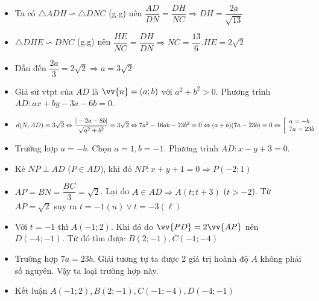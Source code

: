 \begin{itemize}[leftmargin=*,label=]
\item Ta có $\triangle ADH\backsim \triangle DNC$ (g.g) nên $\dfrac{AD}{DN}=\dfrac{DH}{NC}\Rightarrow DH=\dfrac{2a}{\sqrt{13}}$
\item $\triangle DHE\backsim DNC$ (g.g) nên $\dfrac{HE}{NC}=\dfrac{DH}{DN}\Rightarrow NC=\dfrac{13}{6}.HE=2\sqrt{2}$
\item Dẫn đến $\dfrac{2a}{3}=2\sqrt{2}\Rightarrow a=3\sqrt{2}$
\item Giả sử vtpt của $AD$ là $\vv{n}=(a;b)$ với $a^2+b^2>0$. Phương trình $AD:ax+by-3a-6b=0$.
\item $d(N,AD)=3\sqrt{2}\Leftrightarrow \dfrac{|-2a-8b|}{\sqrt{a^2+b^2}}=3\sqrt{2}\Leftrightarrow 7a^2-16ab-23b^2=0 \Leftrightarrow (a+b)(7a-23b)=0 \Leftrightarrow \left[\begin{array}{ll}a=-b \\ 7a=23b\end{array}\right.$
\item Trường hợp $a=-b$. Chọn $a=1, b=-1$. Phương trình $AD:x-y+3=0$.  
\item Kẻ $NP\perp AD$ ($P\in AD$), khi đó $NP:x+y+1=0 \Rightarrow P(-2;1)$
\item $AP=BN=\dfrac{BC}{3}=\sqrt{2}$. Lại do $A\in AD\Rightarrow A(t;t+3)$ ($t>-2$). Từ $AP=\sqrt{2}$ suy ra $t=-1 (n) \vee t=-3 (\ell)$
\item Với $t=-1$ thì $A(-1;2)$. Khi đó do $\vv{PD}=2\vv{AP}$ nên $D(-4;-1)$. Từ đó tìm được $B(2;-1),C(-1;-4)$
\item Trường hợp $7a=23b$. Giải tương tự ta được 2 giá trị hoành độ $A$ không phải số nguyên. Vậy ta loại trường hợp này.
\item Kết luận $A(-1;2),B(2;-1),C(-1;-4),D(-4;-1)$
\end{itemize}

